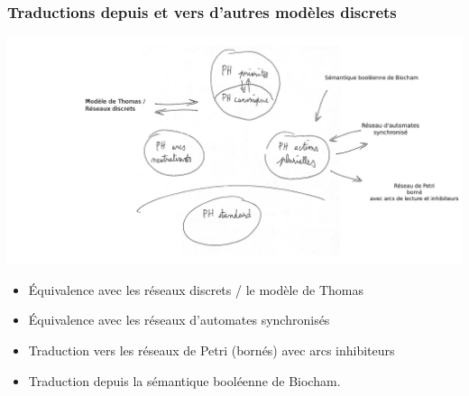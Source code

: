 \begin{frame}[c]
  \frametitle{Traductions depuis et vers d'autres modèles discrets}

\begin{center}
\hspace*{-1cm}\includegraphics[height=.6\textheight]{figs/PH2.png}
\end{center}

\begin{itemize}
  \item Équivalence avec les réseaux discrets / le modèle de Thomas
  \item Équivalence avec les réseaux d'automates synchronisés
  \item Traduction vers les réseaux de Petri (bornés) avec arcs inhibiteurs
  \item Traduction depuis la sémantique booléenne de Biocham.
\end{itemize}

\end{frame}
